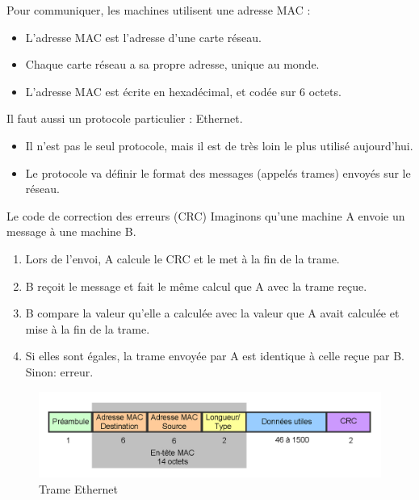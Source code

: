 \documentclass{beamer}
\begin{document}
\begin{frame}[allowframebreaks]
    Pour communiquer, les machines utilisent une adresse MAC :
    \begin{itemize}
        \item L'adresse MAC est l'adresse d'une carte réseau.
        \item Chaque carte réseau a sa propre adresse, unique au monde.
        \item L'adresse MAC est écrite en hexadécimal, et codée sur 6 octets.
    \end{itemize}
    
    Il faut aussi un protocole particulier : Ethernet.
    \begin{itemize}
        \item Il n'est pas le seul protocole, mais il est de très loin le plus utilisé aujourd'hui.
        \item Le protocole va définir le format des messages (appelés trames) envoyés sur le réseau.
    \end{itemize}
    \framebreak
    
    \begin{block}{Le code de correction des erreurs (CRC)}
        Imaginons qu'une machine A envoie un message à une machine B.
        \begin{enumerate}
            \item Lors de l'envoi, A calcule le CRC et le met à la fin de la trame.
            \item B reçoit le message et fait le même calcul que A avec la trame reçue.
            \item B compare la valeur qu'elle a calculée avec la valeur que A avait calculée et mise à la fin de la trame.
            \item Si elles sont égales, la trame envoyée par A est identique à celle reçue par B. Sinon: erreur.
        \end{enumerate}
    \end{block}
    \framebreak
    
    \begin{figure}[h]
        \includegraphics[scale=0.35]{2-Trame_Ethernet}
        \caption{Trame Ethernet}
    \end{figure}
    \framebreak
    

\end{frame}
\end{document}
